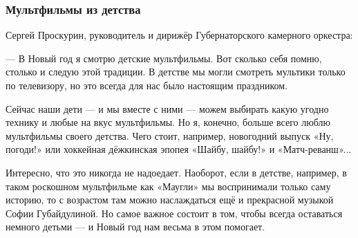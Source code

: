 \subsubsection{Мультфильмы из детства}

Сергей Проскурин, руководитель и дирижёр Губернаторского камерного оркестра:

\begin{zzquote}
— В Новый год я смотрю детские мультфильмы. Вот сколько себя помню, столько
и следую этой традиции. В детстве мы могли смотреть мультики только по
телевизору, но это всегда для нас было настоящим праздником.

Сейчас наши дети — и мы вместе с ними — можем выбирать какую угодно технику
и любые на вкус мультфильмы. Но я, конечно, больше всего люблю мультфильмы
своего детства. Чего стоит, например, новогодний выпуск «Ну, погоди!» или
хоккейная дёжкинская эпопея «Шайбу, шайбу!» и «Матч-реванш»...

Интересно, что это никогда не надоедает. Наоборот, если в детстве,
например, в таком роскошном мультфильме как «Маугли» мы воспринимали только
саму историю, то с возрастом там можно наслаждаться ещё и прекрасной
музыкой Софии Губайдулиной. Но самое важное состоит в том, чтобы всегда
оставаться немного детьми — и Новый год нам весьма в этом помогает.
\end{zzquote}
